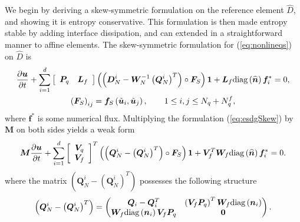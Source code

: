 \documentclass[review]{siamart0216}
\theoremstyle{assumption}
\renewcommand{\hat}[1]{\widehat{#1}}
\newcommand{\pd}[2]{\frac{\partial#1}{\partial#2}}
\newcommand{\LRp}[1]{\left( #1 \right)}
\newcommand{\LRs}[1]{\left[ #1 \right]}
\newcommand{\diag}[1]{{\rm diag}\LRp{#1}}
\begin{document}
We begin by deriving a skew-symmetric formulation on the reference element $\hat{D}$, and showing it is entropy conservative.  This formulation is then made entropy stable by adding interface dissipation, and can extended in a straightforward manner to affine elements.  The skew-symmetric formulation for (\ref{eq:nonlineqs}) on $\hat{D}$ is 
\begin{gather}
\pd{\bm{u}}{t} + \sum_{i=1}^d \LRs{\begin{array}{cc}
\bm{P}_q & \bm{L}_f\end{array}} \LRp{\LRp{\bm{D}^i_N - \bm{W}_N^{-1}\LRp{\bm{Q}^i_N}^T} \circ \bm{F}_S}\bm{1} + \bm{L}_f \diag{\hat{\bm{n}}}\bm{f}_i^* = 0,\\
\LRp{\bm{F}_S}_{ij} = \bm{f}_S\LRp{\tilde{\bm{u}}_i,\tilde{\bm{u}}_j}, \qquad 1\leq i,j\leq N_q + N^f_q,
\label{eq:esdgSkew}
\end{gather}
where $\bm{f}^*$ is some numerical flux.  Multiplying the formulation (\ref{eq:esdgSkew}) by $\bm{M}$ on both sides yields a weak form 
\begin{gather}
\bm{M}\pd{\bm{u}}{t} + \sum_{i=1}^d\LRs{\begin{array}{c}
\bm{V}_q \\ \bm{V}_f\end{array}}^T 
\LRp{\LRp{\bm{Q}^i_N - \LRp{\bm{Q}^i_N}^T} \circ \bm{F}_S}\bm{1} + \bm{V}_f^T\bm{W}_f \diag{\hat{\bm{n}}}\bm{f}_i^* = 0.  \label{eq:esdgSkewWeak}
\end{gather}
where the matrix $\LRp{\bm{Q}^i_N - \LRp{\bm{Q}^i_N}^T}$ possesses the following structure
\[
\LRp{\bm{Q}^i_N - \LRp{\bm{Q}^i_N}^T} = \begin{pmatrix}
\bm{Q}_i-\bm{Q}_i^T & \LRp{\bm{V}_f \bm{P}_q}^T\bm{W}_f\diag{\bm{n}_i}\\
\bm{W}_f\diag{\bm{n}_i}{\bm{V}_f \bm{P}_q} & \bm{0}
\end{pmatrix}.
\]
\end{document}
